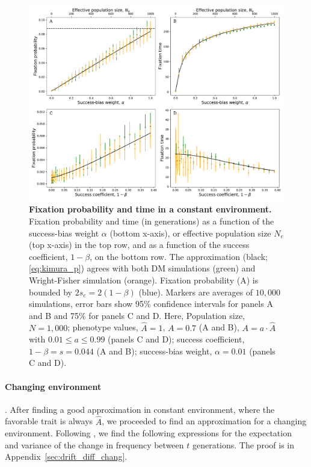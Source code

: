 \documentclass[12pt]{extarticle}
\begin{document}
\begin{figure}[h]
    \includegraphics[width=\linewidth]{../figures/final/kimura_var.pdf}
  \caption{\textbf{Fixation probability and time in a constant environment.}
  Fixation probability and time (in generations) as a function of the success-bias weight $\alpha$ (bottom x-axis), or effective population size $N_e$ (top x-axis) in the top row, and as a function of the success coefficient, $1-\beta$, on the bottom row.
  The approximation (black; \cref{eq:kimura_p}) agrees with both DM simulations (green) and Wright-Fisher simulation (orange).
  Fixation probability (A) is bounded by $2s_e=2(1-\beta)$ (blue).
  Markers are averages of $10,000$ simulations, error bars show 95\% confidence intervals for panels A and B and 75\% for panels C and D.
   Here, Population size, $N=1,000$; phenotype values, $\hat{A}=1$, $A=0.7$ (A and B), $A = a \cdot \hat{A}$ with $0.01 \le a \le 0.99$ (panels C and D); success coefficient, $1-\beta=s=0.044$ (A and B); success-bias weight, $\alpha=0.01$ (panels C and D).}
  \label{fig:var_alpha}
\end{figure}


\paragraph*{Changing environment}. After finding a good approximation in constant environment, where the favorable trait is always $\hat{A}$, we proceeded to find an approximation for a changing environment. 
Following \citet{changeEnv}, we find the following expressions for the expectation and variance of the change in frequency between $t$ generations. 
The proof is in Appendix~\ref{sec:drift_diff_chang}.
\\
\end{document}
